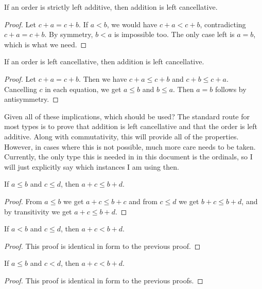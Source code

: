 \documentclass[../../math.tex]{subfiles}
\begin{document}
\begin{instance} \label{plus_lcancel1}
    If an order is strictly left additive, then addition is left cancellative.
\end{instance}
\begin{proof}
    Let $c + a = c + b$.  If $a < b$, we would have $c + a < c + b$,
    contradicting $c + a = c + b$.  By symmetry, $b < a$ is impossible too.  The
    only case left is $a = b$, which is what we need.
\end{proof}

\begin{instance} \label{plus_lcancel2}
    If an order is left cancellative, then addition is left cancellative.
\end{instance}
\begin{proof}
    Let $c + a = c + b$.  Then we have $c + a \leq c + b$ and $c + b \leq c +
    a$.  Cancelling $c$ in each equation, we get $a \leq b$ and $b \leq a$.
    Then $a = b$ follows by antisymmetry.
\end{proof}

Given all of these implications, which should be used?  The standard route for
most types is to prove that addition is left cancellative and that the order is
left additive.  Along with commutativity, this will provide all of the
properties.  However, in cases where this is not possible, much more care needs
to be taken.  Currently, the only type this is needed in in this document is the
ordinals, so I will just explicitly say which instances I am using then.

\begin{theorem} \label{le_lrplus}
    If $a \leq b$ and $c \leq d$, then $a + c \leq b + d$.
\end{theorem}
\begin{proof}
    From $a \leq b$ we get $a + c \leq b + c$ and from $c \leq d$ we get $b + c
    \leq b + d$, and by transitivity we get $a + c \leq b + d$.
\end{proof}

\begin{theorem} \label{lt_le_lrplus}
    If $a < b$ and $c \leq d$, then $a + c < b + d$.
\end{theorem}
\begin{proof}
    This proof is identical in form to the previous proof.
\end{proof}

\begin{theorem} \label{le_lt_lrplus}
    If $a \leq b$ and $c < d$, then $a + c < b + d$.
\end{theorem}
\begin{proof}
    This proof is identical in form to the previous proofs.
\end{proof}
\end{document}
